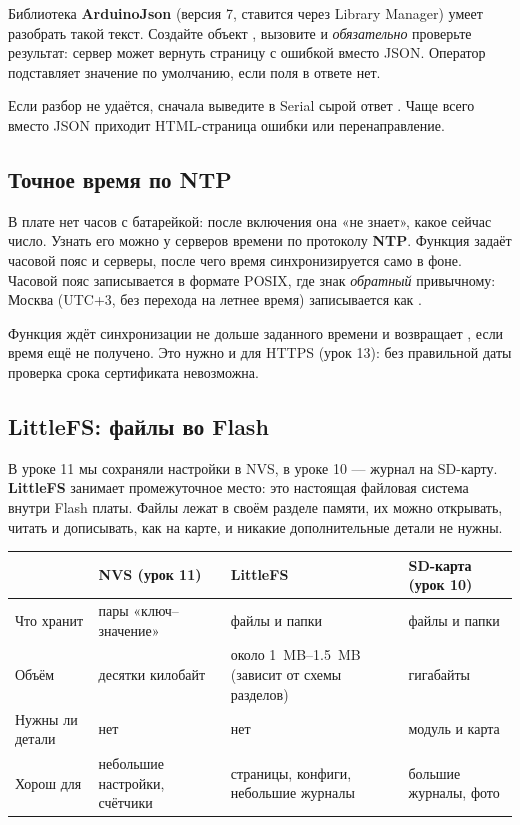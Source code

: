 Библиотека \textbf{ArduinoJson} (версия 7, ставится через Library Manager) умеет разобрать такой текст.
Создайте объект , вызовите  и \emph{обязательно} проверьте результат: сервер может
вернуть страницу с ошибкой вместо JSON. Оператор \code{|} подставляет значение по умолчанию, если поля в ответе нет.


\begin{tip}
Если разбор не удаётся, сначала выведите в Serial сырой ответ . Чаще всего вместо JSON приходит
HTML-страница ошибки или перенаправление.
\end{tip}

\subsection{Точное время по NTP}

В плате нет часов с батарейкой: после включения она «не знает», какое сейчас число. Узнать его можно
у серверов времени по протоколу \textbf{NTP}. Функция  задаёт часовой пояс и серверы,
после чего время синхронизируется само в фоне. Часовой пояс записывается в формате POSIX, где знак
\emph{обратный} привычному: Москва (UTC+3, без перехода на летнее время) записывается как .

Функция  ждёт синхронизации не дольше заданного времени и возвращает
, если время ещё не получено. Это нужно и для HTTPS (урок 13): без правильной даты проверка
срока сертификата невозможна.


\subsection{LittleFS: файлы во Flash}

В уроке 11 мы сохраняли настройки в NVS, в уроке 10 --- журнал на SD-карту. \textbf{LittleFS} занимает
промежуточное место: это настоящая файловая система внутри Flash платы. Файлы лежат в своём разделе
памяти, их можно открывать, читать и дописывать, как на карте, и никакие дополнительные детали не нужны.

\begin{center}\small
\begin{tabularx}{\textwidth}{@{}l X X X@{}}
\toprule
 & NVS (урок 11) & LittleFS & SD-карта (урок 10) \\
\midrule
Что хранит & пары «ключ--значение» & файлы и папки & файлы и папки \\
Объём & десятки килобайт & около \SIrange{1}{1.5}{MB} (зависит от схемы разделов) & гигабайты \\
Нужны ли детали & нет & нет & модуль и карта \\
Хорош для & небольшие настройки, счётчики & страницы, конфиги, небольшие журналы & большие журналы, фото \\
\bottomrule
\end{tabularx}
\end{center}

